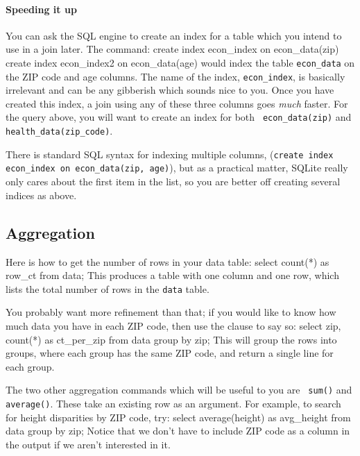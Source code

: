 \paragraph{Speeding it up}
You can ask the SQL engine to create an index for a table which you
intend to use in a join later. The command:
create index econ_index on econ_data(zip)
create index econ_index2 on econ_data(age)
would index the table {\tt econ\_data} on the ZIP code and age columns.
The name of the index, {\tt econ\_index}, is basically irrelevant and can
be any gibberish which sounds nice to you. Once you have created this
index, a join using any of these three columns goes {\sl much} faster.
For the query above, you will want to create an index for both {\tt
econ\_data(zip)} and {\tt health\_data(zip\_code)}.

There is standard SQL syntax for indexing multiple columns, 
({\tt create index econ\_index on econ\_data(zip, age)}), but as a
practical matter, SQLite really only cares about the first item in the
list, so you are better off creating several indices as above.

\subsection{Aggregation}
Here is how to get the number of rows in your data table:
select count(*) as row_ct 
from data;
This produces a table with one column and one row, which lists the total number of rows in the {\tt data} table.

You probably want more refinement than that; if you would like to
know how much data you have in each ZIP code, then use the  clause to say so:
select zip, count(*) as ct_per_zip
from data
group by zip;
This will group the rows into groups, where each group has the same ZIP
code, and return a single line for each group.


The two other aggregation commands which will be useful to you are {\tt
sum()} and {\tt average()}. These take an existing row as an argument.
For example, to search for height disparities by ZIP code, try:
select  average(height) as avg_height
from data
group by zip;
Notice that we don't have to include ZIP code as a column in the output
if we aren't interested in it.

